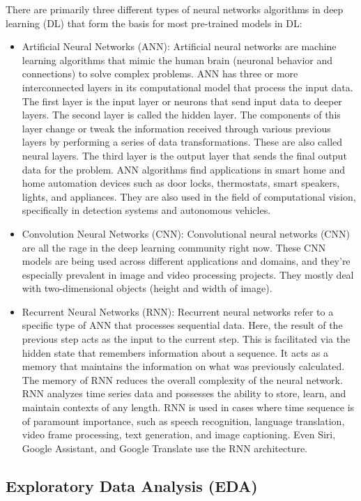 \documentclass[11pt]{article}
\begin{document}
There are primarily three different types of neural networks algorithms in deep learning (DL) that form the basis for most pre-trained models in DL:

\begin{itemize}
\item Artificial Neural Networks (ANN): Artificial neural networks are machine learning algorithms that mimic the human brain (neuronal behavior and connections) to solve complex problems. ANN has three or more interconnected layers in its computational model that process the input data. The first layer is the input layer or neurons that send input data to deeper layers. The second layer is called the hidden layer. The components of this layer change or tweak the information received through various previous layers by performing a series of data transformations. These are also called neural layers. The third layer is the output layer that sends the final output data for the problem. ANN algorithms find applications in smart home and home automation devices such as door locks, thermostats, smart speakers, lights, and appliances. They are also used in the field of computational vision, specifically in detection systems and autonomous vehicles.
\item Convolution Neural Networks (CNN): Convolutional neural networks (CNN) are all the rage in the deep learning community right now. These CNN models are being used across different applications and domains, and they’re especially prevalent in image and video processing projects. They mostly deal with two-dimensional objects (height and width of image). 
\item Recurrent Neural Networks (RNN): Recurrent neural networks refer to a specific type of ANN that processes sequential data. Here, the result of the previous step acts as the input to the current step. This is facilitated via the hidden state that remembers information about a sequence. It acts as a memory that maintains the information on what was previously calculated. The memory of RNN reduces the overall complexity of the neural network. RNN analyzes time series data and possesses the ability to store, learn, and maintain contexts of any length. RNN is used in cases where time sequence is of paramount importance, such as speech recognition, language translation, video frame processing, text generation, and image captioning. Even Siri, Google Assistant, and Google Translate use the RNN architecture.
\end{itemize} 


\subsection{Exploratory Data Analysis (EDA)}
\end{document}
